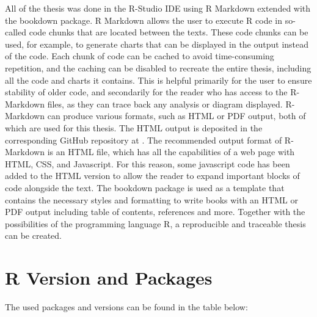 \documentclass[
  oneside, a4paper, 12pt, openany]{book}
\theoremstyle{definition}
\theoremstyle{definition}
\theoremstyle{definition}
\theoremstyle{definition}
\theoremstyle{remark}
\begin{document}
All of the thesis was done in the R-Studio IDE using R Markdown extended with the bookdown package. R Markdown allows the user to execute R code in so-called code chunks that are located between the texts. These code chunks can be used, for example, to generate charts that can be displayed in the output instead of the code. Each chunk of code can be cached to avoid time-consuming repetition, and the caching can be disabled to recreate the entire thesis, including all the code and charts it contains. This is helpful primarily for the user to ensure stability of older code, and secondarily for the reader who has access to the R-Markdown files, as they can trace back any analysis or diagram displayed. R-Markdown can produce various formats, such as HTML or PDF output, both of which are used for this thesis. The HTML output is deposited in the corresponding GitHub repository at \citep{GitHub}. The recommended output format of R-Markdown is an HTML file, which has all the capabilities of a web page with HTML, CSS, and Javascript. For this reason, some javascript code has been added to the HTML version to allow the reader to expand important blocks of code alongside the text. The bookdown package is used as a template that contains the necessary styles and formatting to write books with an HTML or PDF output including table of contents, references and more. Together with the possibilities of the programming language R, a reproducible and traceable thesis can be created.

\hypertarget{r-version-and-packages}{%
\section{R Version and Packages}\label{r-version-and-packages}}

The used packages and versions can be found in the table below:

\vspace{0.1cm}\fontsize{11}{13}\selectfont
\end{document}

